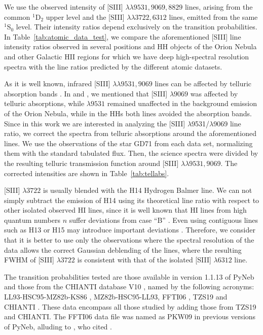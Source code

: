\documentclass[fleqn,usenatbib]{mnras}
\begin{document}
We use the observed intensity of [S\thinspace III] $\lambda \lambda 9531, 9069, 8829$ lines, arising from the common $^1$D$_2$ upper level and the [S\thinspace III] $\lambda \lambda 3722, 6312$ lines, emitted from the same $^1$S$_0$ level. Their intensity ratios depend exclusively on the transition probabilities. In Table~\ref{tab:atomic_data_test}, we compare the aforementioned [S\thinspace III] line intensity ratios observed in several positions and HH objects of the Orion Nebula and other Galactic H\thinspace II regions for which we have deep high-spectral resolution spectra with the line ratios predicted by the different atomic datasets.    

As it is well known, infrared [S\thinspace III] $\lambda \lambda 9531, 9069$ lines can be affected by telluric absorption bands \citep{Noll12}. In \citet{mendez2021} and \citet{mendez2021-2}, we mentioned that [S\thinspace III] $\lambda 9069$ was affected by telluric absorptions, while $\lambda 9531$ remained unaffected in the background emission of the Orion Nebula, while in the HHs both lines avoided the absorption bands. Since in this work we are interested in analyzing the [S\thinspace III] $\lambda$9531/$\lambda$9069 line ratio, we correct the spectra from telluric absorptions around the aforementioned lines. We use the observations of the star GD71 from each data set, normalizing them with the standard tabulated flux. Then, the science spectra were divided by the resulting telluric transmission function around [S\thinspace III] $\lambda \lambda 9531, 9069$. The corrected intensities are shown in Table~\ref{tab:tellabs}. 

[S\thinspace III] $\lambda 3722$ is usually blended with the H14 Hydrogen Balmer line. We can not simply subtract the emission of H14 using its theoretical line ratio with respect to other isolated observed H\thinspace I lines, since it is well known that H\thinspace I lines from high quantum numbers $n$ suffer deviations from case ``B'' \citep[][]{mesadelgado09, rodriguez20}. Even using  contiguous lines such as H13 or H15 may introduce important deviations \citep[see fig.~A2 of][]{rodriguez20}. Therefore, we consider that it is better to use only the observations where the spectral resolution of the data allows the correct Gaussian deblending of the lines, where the resulting FWHM of [S\thinspace III] $\lambda 3722$ is consistent with that of the isolated [S\thinspace III] $\lambda 6312$ line.

The transition probabilities tested are those available in version 1.1.13 of PyNeb and those from the CHIANTI database V10 \citep[][]{Chianti10}, named by the following acronyms: LL93-HSC95-MZ82b-KS86 \citep[][]{LL93,HSC95,MZ82b, KS86}, MZ82b-HSC95-LL93\citep[][]{MZ82b,HSC95,LL93}, FFTI06 \citep[][]{FFTI06}, TZS19\citep[][]{TZS19} and CHIANTI \citep[][]{Tayal97,FFTI06, Hudson12}. These data encompass all those studied by \citet{Juan-de-Dios17} adding  those from TZS19 and CHIANTI. The FFTI06 data file  was named as PKW09 in previous versions of PyNeb, alluding to \citet{Podobedova09}, who cited \citet{FFTI06}. 
\end{document}
